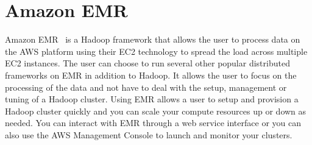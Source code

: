 \section{Amazon EMR}
Amazon EMR~\cite{hid-sp18-521-AmazonEMR} is a Hadoop framework that allows
the user to process data on the AWS platform using their EC2 technology to
spread the load across multiple EC2 instances. The user can choose to run 
several other popular distributed frameworks on EMR in addition to Hadoop. 
It allows the user to focus on the processing of the data and not have to
deal with the setup, management or tuning of a Hadoop cluster. Using EMR
allows a user to setup and provision a Hadoop cluster quickly and you can
scale your compute resources up or down as needed. You can interact with
EMR through a web service interface or you can also use the AWS Management
Console to launch and monitor your clusters.
